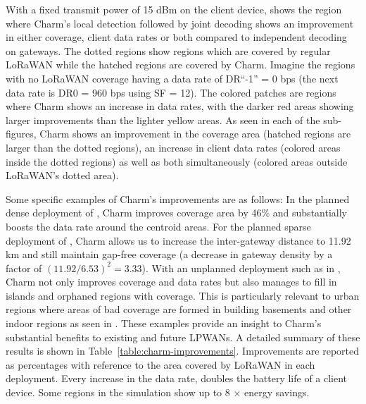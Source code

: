 With a fixed transmit power of 15 dBm on the client device,
 shows the region where Charm's local detection
followed by joint decoding shows an improvement in either coverage, client
data rates or both compared to independent decoding on gateways. The dotted
regions show regions which are covered by regular LoRaWAN while the hatched
regions are covered by Charm. Imagine the regions with no LoRaWAN coverage
having a data rate of DR``-1'' = 0 bps (the next data rate is DR0 = 960 bps
using SF = 12). The colored patches are regions where Charm shows an increase
in data rates, with the darker red areas showing larger improvements than the
lighter yellow areas. As seen in each of the sub-figures, Charm shows an
improvement in the coverage area (hatched regions are larger than the dotted
regions), an increase in client data rates (colored areas inside the dotted
regions) as well as both simultaneously (colored areas outside LoRaWAN's
dotted area).

Some specific examples of Charm's improvements are as follows: In the planned
dense deployment of , Charm improves coverage area
by 46\% and substantially boosts the data rate around the centroid areas. For
the planned sparse deployment of , Charm allows us
to increase the inter-gateway distance to 11.92 km and still maintain gap-free
coverage (a decrease in gateway density by a factor of $(11.92/6.53)^2=3.33$).
With an unplanned deployment such as in , Charm not
only improves coverage and data rates but also manages to fill in islands and
orphaned regions with coverage. This is particularly relevant to urban regions
where areas of bad coverage are formed in building basements and other indoor
regions as seen in . These examples provide an
insight to Charm's substantial benefits to existing and future LPWANs. A
detailed summary of these results is shown in
Table~\ref{table:charm-improvements}. Improvements are reported as percentages
with reference to the area covered by LoRaWAN in each deployment. Every
increase in the data rate, doubles the battery life of a client device. Some
regions in the simulation show up to 8 $\times$ energy savings.

